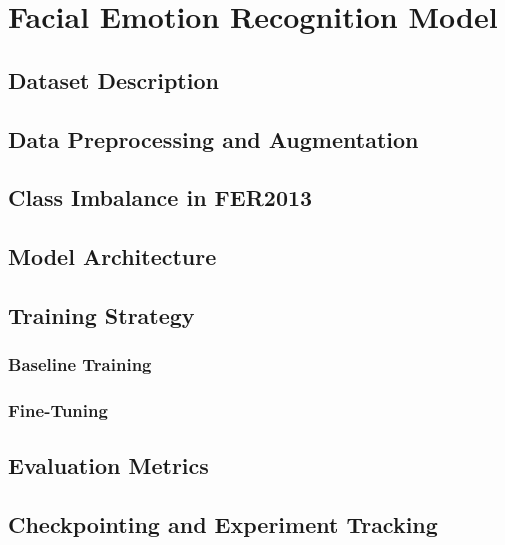 \chapter{Facial Emotion Recognition Model}

\section{Dataset Description}

\section{Data Preprocessing and Augmentation}

\section{Class Imbalance in FER2013}

\section{Model Architecture}

\section{Training Strategy}

\subsection{Baseline Training}

\subsection{Fine-Tuning}

\section{Evaluation Metrics}

\section{Checkpointing and Experiment Tracking}
